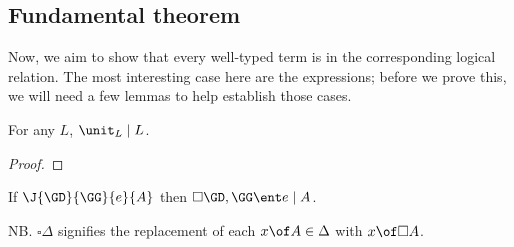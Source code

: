 \documentclass{article}
\newcommand{\disc}[1]{\square{#1}}
\newcommand{\lr}[2]{#2\mathrel{|}#1}
\newcommand{\lrcx}[3]{#1 \ent \lr{#2}{#3}}
\begin{document}

\subsection{Fundamental theorem}

Now, we aim to show that every well-typed term is in the corresponding logical
relation. The most interesting case here are the  expressions; before we
prove this, we will need a few lemmas to help establish those cases.

\begin{lemma}
  For any $L$, $\lr{L}{\unit_L}$.
\end{lemma}
\begin{proof}
  \TODO
\end{proof}


\newcommand{\cxdisc}[1]{\disc{#1}}

\begin{theorem}
  If $\J{\GD}{\GG}{e}{A}$ then $\lrcx{\cxdisc{\GD},\GG}{A}{e}$.
\end{theorem}

NB. $\cxdisc{\Delta}$ signifies the replacement of each $x \of A \in \Delta$
with $x \of \disc{A}$.
\end{document}
